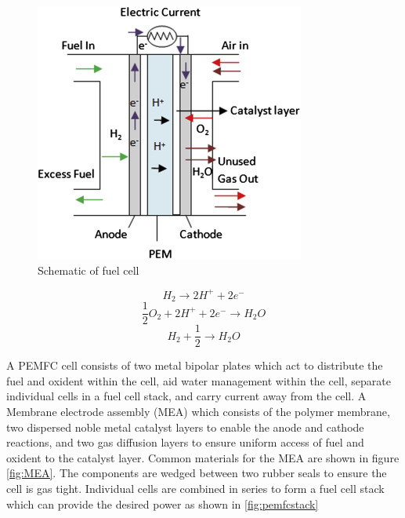\begin{figure}[H]
    \centering
    \includegraphics{figures/pemfccell.jpg}
    \caption{Schematic of fuel cell \cite{Dharmalingam2019}}
    \label{fig:pemfccell}
\end{figure}

\begin{equation} \label{pemfcanode}
    H_2 \rightarrow 2H^+ + 2e^-
\end{equation}
\begin{equation} \label{pemfccathode}
    \frac{1}{2}O_2 + 2H^+ + 2e^- \rightarrow H_2 O
\end{equation}
\begin{equation} \label{pemfcall}
    H_2 + \frac{1}{2} \rightarrow H_2O
\end{equation}


 A PEMFC cell consists of two metal bipolar plates which act to distribute the fuel and oxident within the cell, aid water management within the cell, separate individual cells in a fuel cell stack, and carry current away from the cell. \cite{Alaswad2016} A Membrane electrode assembly (MEA) which consists of the polymer membrane, two dispersed noble metal catalyst layers to enable the anode and cathode reactions, and two gas diffusion layers to ensure uniform access of fuel and oxident to the catalyst layer. Common materials for the MEA are shown in figure \ref{fig:MEA}\cite{Mehta2003}. The components are wedged between two rubber seals to ensure the cell is gas tight. Individual cells are combined in series to form a fuel cell stack which can provide the desired power as shown in \ref{fig:pemfcstack}

